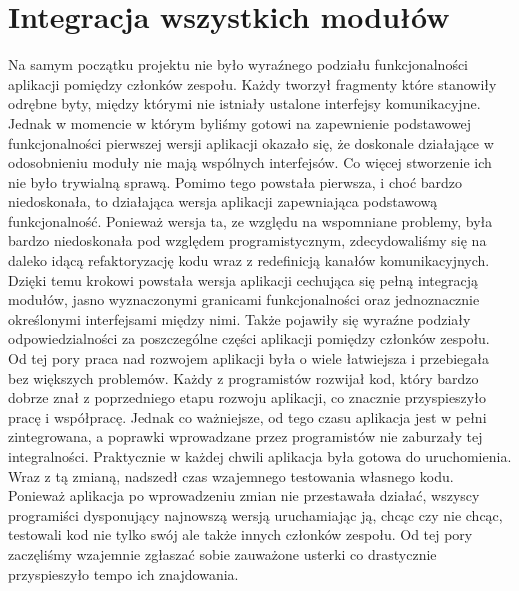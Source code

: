 \section{Integracja wszystkich modułów}
Na samym początku projektu nie było wyraźnego podziału funkcjonalności aplikacji pomiędzy członków zespołu. Każdy tworzył fragmenty które stanowiły odrębne byty, między którymi nie istniały ustalone interfejsy komunikacyjne. Jednak w momencie w którym byliśmy gotowi na zapewnienie podstawowej funkcjonalności pierwszej wersji aplikacji okazało się, że doskonale działające w odosobnieniu moduły nie mają wspólnych interfejsów. Co więcej stworzenie ich nie było trywialną sprawą. Pomimo tego powstała pierwsza, i choć bardzo niedoskonała, to działająca wersja aplikacji zapewniająca podstawową funkcjonalność.
Ponieważ wersja ta, ze względu na wspomniane problemy, była bardzo niedoskonała pod względem programistycznym, zdecydowaliśmy się na daleko idącą refaktoryzację kodu wraz z redefinicją kanałów komunikacyjnych. Dzięki temu krokowi powstała wersja aplikacji cechująca się pełną integracją modułów, jasno wyznaczonymi granicami funkcjonalności oraz jednoznacznie określonymi interfejsami między nimi. Także pojawiły się wyraźne podziały odpowiedzialności za poszczególne części aplikacji pomiędzy członków zespołu.
Od tej pory praca nad rozwojem aplikacji była o wiele łatwiejsza i przebiegała bez większych problemów. Każdy z programistów rozwijał kod, który bardzo dobrze znał z poprzedniego etapu rozwoju aplikacji, co znacznie przyspieszyło pracę i współpracę. Jednak co ważniejsze, od tego czasu aplikacja jest w pełni zintegrowana, a poprawki wprowadzane przez programistów nie zaburzały tej integralności. Praktycznie w każdej chwili aplikacja była gotowa do uruchomienia.
Wraz z tą zmianą, nadszedł czas wzajemnego testowania własnego kodu. Ponieważ aplikacja po wprowadzeniu zmian nie przestawała działać, wszyscy programiści dysponujący najnowszą wersją uruchamiając ją, chcąc czy nie chcąc, testowali kod nie tylko swój ale także innych członków zespołu. Od tej pory zaczęliśmy wzajemnie zgłaszać sobie zauważone usterki co drastycznie przyspieszyło tempo ich znajdowania.
